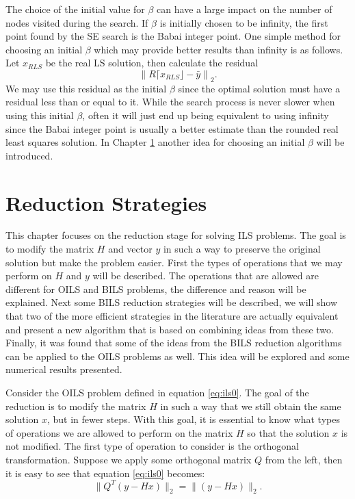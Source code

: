 \documentclass[12pt,Bold,letterpaper]{mcgilletdclass}
\begin{document}
The choice of the initial value for $\beta$ can have a large impact on the number of nodes visited during the search. If $\beta$ is initially chosen to be infinity, the first point found by the SE search is the Babai integer point. One simple method for choosing an initial $\beta$ which may provide better results than infinity is as follows. Let $x_{\scriptscriptstyle{RLS}}$ be the real LS solution, then calculate the residual $$\left \| R \lceil x_{\scriptscriptstyle{RLS}} \rfloor - \bar{y} \right \|_2.$$ We may use this residual as the initial $\beta$ since the optimal solution must have a residual less than or equal to it. While the search process is never slower when using this initial $\beta$, often it will just end up being equivalent to using infinity since the Babai integer point is usually a better estimate than the rounded real least squares solution. In Chapter \ref{chap:Reduction} another idea for choosing an initial $\beta$ will be introduced.

\chapter{Reduction Strategies} \label{chap:Reduction}

This chapter focuses on the reduction stage for solving ILS problems. The goal is to modify the matrix $H$ and vector $y$ in such a way to preserve the original solution but make the problem easier. First the types of operations that we may perform on $H$ and $y$ will be described. The operations that are allowed are different for OILS and BILS problems, the difference and reason will be explained. Next some BILS reduction strategies will be described, we will show that two of the more efficient strategies in the literature are actually equivalent and present a new algorithm that is based on combining ideas from these two. Finally, it was found that some of the ideas from the BILS reduction algorithms can be applied to the OILS problems as well. This idea will be explored and some numerical results presented.

Consider the OILS problem defined in equation \eqref{eq:ils0}. The goal of the reduction is to modify the matrix $H$ in such a way that we still obtain the same solution $x$, but in fewer steps. With this goal, it is essential to know what types of operations we are allowed to perform on the matrix $H$ so that the solution $x$ is not modified. The first type of operation to consider is the orthogonal transformation. Suppose we apply some orthogonal matrix $Q$ from the left, then it is easy to see that equation \eqref{eq:ils0} becomes: $$ \| Q^T(y- Hx)\|_2 = \| (y- Hx) \|_2.$$ 
\end{document}
